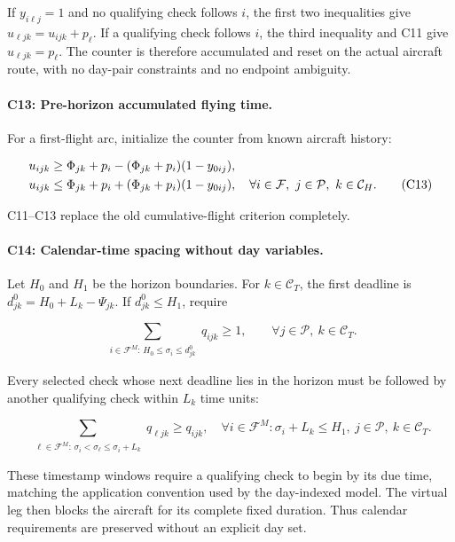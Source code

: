 \documentclass[11pt,a4paper]{article}
\newcommand{\F}{\mathcal{F}}
\newcommand{\Pset}{\mathcal{P}}
\newcommand{\Cset}{\mathcal{C}}
\begin{document}
If $y_{i\ell j}=1$ and no qualifying check follows $i$, the first two
inequalities give $u_{\ell jk}=u_{ijk}+p_\ell$. If a qualifying check follows
$i$, the third inequality and C11 give $u_{\ell jk}=p_\ell$. The counter is
therefore accumulated and reset on the actual aircraft route, with no day-pair
constraints and no endpoint ambiguity.

\paragraph{C13: Pre-horizon accumulated flying time.}
For a first-flight arc, initialize the counter from known aircraft history:

\begin{align}
  u_{ijk}&\geq\Phi_{jk}+p_i-(\Phi_{jk}+p_i)(1-y_{0ij}),
  \notag\\
  u_{ijk}&\leq\Phi_{jk}+p_i+(\Phi_{jk}+p_i)(1-y_{0ij}),
  \quad \forall i\in\F,\ j\in\Pset,\ k\in\Cset_H.
  \tag{C13}\label{eq:event_c13}
\end{align}

C11--C13 replace the old cumulative-flight criterion completely.

\paragraph{C14: Calendar-time spacing without day variables.}
Let $H_0$ and $H_1$ be the horizon boundaries. For $k\in\Cset_T$, the first
deadline is $d^0_{jk}=H_0+L_k-\Psi_{jk}$. If $d^0_{jk}\leq H_1$, require

\begin{equation}
  \sum_{\substack{i\in\F^M:\,H_0\leq\sigma_i\leq d^0_{jk}}}q_{ijk}\geq1,
  \qquad \forall j\in\Pset,\ k\in\Cset_T.
  \tag{C14a}\label{eq:event_c14a}
\end{equation}

Every selected check whose next deadline lies in the horizon must be followed
by another qualifying check within $L_k$ time units:

\begin{equation}
  \sum_{\substack{\ell\in\F^M:\,
                    \sigma_i<\sigma_\ell\leq\sigma_i+L_k}}
  q_{\ell jk}\geq q_{ijk},
  \quad
  \forall i\in\F^M:\sigma_i+L_k\leq H_1,\ j\in\Pset,\ k\in\Cset_T.
  \tag{C14b}\label{eq:event_c14b}
\end{equation}

These timestamp windows require a qualifying check to begin by its due time,
matching the application convention used by the day-indexed model. The virtual
leg then blocks the aircraft for its complete fixed duration. Thus calendar
requirements are preserved without an explicit day set.
\end{document}
